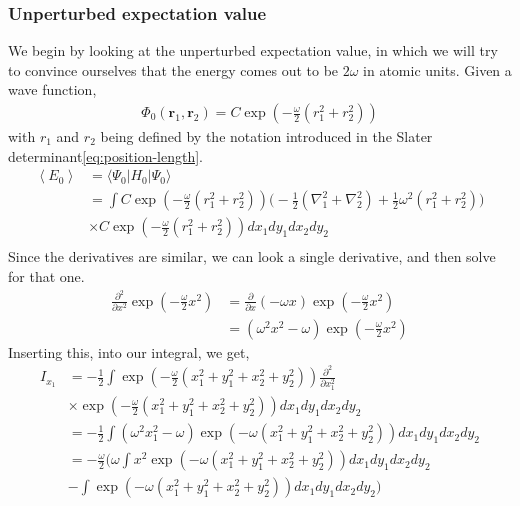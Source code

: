 \documentclass[11pt]{article}
\newcommand{\expect}[1]{\left\langle{#1}\right\rangle}
\newcommand{\bra}[1]{\langle{#1}|}
\newcommand{\ket}[1]{|{#1}\rangle}
\begin{document}
\subsubsection{Unperturbed expectation value}
We begin by looking at the unperturbed expectation value, in which we will try to convince ourselves that the energy comes out to be $2\omega$ in atomic units. Given a wave function,
\begin{align}
	\Phi_0(\mathbf{r}_1,\mathbf{r}_2) = C \exp \left(-\frac{\omega}{2}(r_1^2 + r_2^2)\right)
	\label{eq:two-body-wf}
\end{align}
with $r_1$ and $r_2$ being defined by the notation introduced in the Slater determinant\eqref{eq:position-length}.
\begin{align*}
	\expect{E_0} &= \bra{\Psi_0}H_0\ket{\Psi_0} \\
	&= \int C\exp \left(-\frac{\omega}{2}(r_1^2 + r_2^2)\right) \Big( -\frac{1}{2} \left(\nabla^2_1 + \nabla^2_2 \right) + \frac{1}{2}\omega^2\left( r_1^2 + r_2^2 \right) \Big) \\ &\times C\exp\left(-\frac{\omega}{2}(r_1^2 + r_2^2)\right) d x_1 d y_1 d x_2 d y_2 \\
\end{align*}
Since the derivatives are similar, we can look a single derivative, and then solve for that one.
\begin{align*}
	\frac{\partial^2}{\partial x^2} \exp \left(-\frac{\omega}{2}x^2\right) &= \frac{\partial}{\partial x} \left( -\omega x \right) \exp \left(-\frac{\omega}{2}x^2\right) \\
	&= \left( \omega^2 x^2 - \omega \right) \exp \left(-\frac{\omega}{2}x^2\right)
\end{align*}
Inserting this, into our integral, we get,
\begin{align*}
	I_{x_1} &= -\frac{1}{2}\int \exp \left(-\frac{\omega}{2}\left(x_1^2 + y_1^2 + x_2^2 + y_2^2\right)\right) \frac{\partial^2}{\partial x_1^2} \\
	&\times \exp \left(-\frac{\omega}{2}\left(x_1^2 + y_1^2 + x_2^2 + y_2^2\right)\right) dx_1 dy_1 dx_2 dy_2\\
	&= -\frac{1}{2}\int \left( \omega^2 x_1^2 - \omega \right) \exp \left(-\omega\left(x_1^2 + y_1^2 + x_2^2 + y_2^2\right)\right) dx_1 dy_1 dx_2 dy_2\\
	&= -\frac{\omega}{2}\bigg( \omega \int x^2 \exp \left(-\omega\left(x_1^2 + y_1^2 + x_2^2 + y_2^2\right)\right) dx_1 dy_1 dx_2 dy_2 \\
	&- \int \exp \left(-\omega\left(x_1^2 + y_1^2 + x_2^2 + y_2^2\right)\right) dx_1 dy_1 dx_2 dy_2 \bigg)\\
\end{align*}
\end{document}
